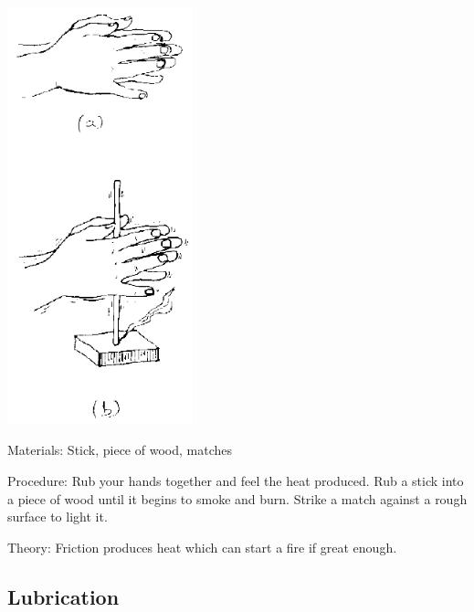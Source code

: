 \begin{multicols}{2}
\begin{center}
\includegraphics[width=0.4\textwidth]{./img/source/friction-heat.png}
\end{center}

\begin{description*}
\item[Materials:]{Stick, piece of wood, matches}
\item[Procedure:]{Rub your hands together and feel the heat produced. Rub a stick into a piece of wood until it begins to smoke and burn. Strike a match against a rough surface to light it.}
\item[Theory:]{Friction produces heat which can start a fire if great enough.}
\end{description*}

\vfill
\columnbreak

\subsection{Lubrication}


\end{multicols}
